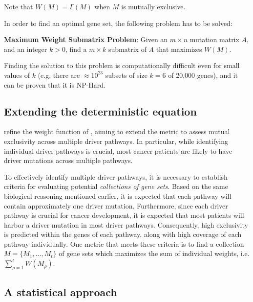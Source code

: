 Note that $W(M) = \Gamma(M)$ when $M$ is mutually exclusive.

In order to find an optimal gene set, the following problem has to be solved:

\begin{displayquote}\label{mwsp}
    \textbf{Maximum Weight Submatrix Problem}: Given an $m \times n$ mutation matrix $A$, and an integer $k > 0$, find a $m \times k$ submatrix of $A$ that maximizes $W(M)$.
\end{displayquote}

Finding the solution to this problem is computationally difficult even for small values of $k$ (e.g. there are $\approx 10^{23}$ subsets of size $k = 6$ of 20,000 genes), and it can be proven that it is NP-Hard. 

\subsection{Extending the deterministic equation} \label{multi_dendrix_2nd_chap} 

\textcite{multi-dendrix} refine the weight function of \textcite{dendrix}, aiming to extend the metric to assess mutual exclusivity across multiple driver pathways. In particular, while identifying individual driver pathways is crucial, most cancer patients are likely to have driver mutations across multiple pathways.

To effectively identify multiple driver pathways, it is necessary to establish criteria for evaluating potential \textit{collections of gene sets}. Based on the same biological reasoning mentioned earlier, it is expected that each pathway will contain approximately one driver mutation. Furthermore, since each driver pathway is crucial for cancer development, it is expected that most patients will harbor a driver mutation in most driver pathways. Consequently, high exclusivity is predicted within the genes of each pathway, along with high coverage of each pathway individually. One metric that meets these criteria is to find a collection $M = \{M_1, \ldots, M_t\}$ of gene sets which maximizes the sum of individual weights, i.e. $\sum_{\rho = 1}^t {W(M_\rho)}$.

\subsection{A statistical approach}

